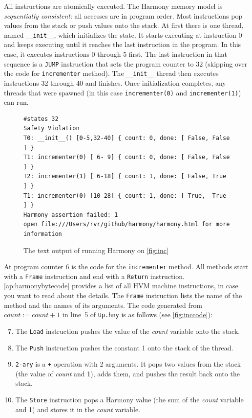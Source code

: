 \documentclass{report}
\newenvironment{code}{
\tcolorbox
}{
\endtcolorbox
}
\begin{document}
%
All instructions are atomically executed.
The Harmony memory model is \emph{sequentially consistent}: all
accesses are in program order.
Most instructions pop values from the stack or push values onto the stack.
At first there is one thread, named \texttt{\_\_init\_\_},
which initializes the state.
It starts executing at instruction 0 and keeps executing until
it reaches the last instruction in the program.
In this case, it executes instructions 0 through 5 first.
The last instruction in that sequence is a \texttt{JUMP}
instruction that sets the program counter to 32
(skipping over the code for \texttt{incrementer} method).
The \texttt{\_\_init\_\_} thread then executes instructions
32 through 40 and finishes.
Once initialization completes, any threads that were spawned
(in this case \texttt{incrementer(0)} and \texttt{incrementer(1)})
can run.

\begin{figure}
\begin{code}
\begin{verbatim}
#states 32
Safety Violation
T0: __init__() [0-5,32-40] { count: 0, done: [ False, False ] }
T1: incrementer(0) [ 6- 9] { count: 0, done: [ False, False ] }
T2: incrementer(1) [ 6-18] { count: 1, done: [ False, True  ] }
T1: incrementer(0) [10-28] { count: 1, done: [ True,  True  ] }
Harmony assertion failed: 1
open file:///Users/rvr/github/harmony/harmony.html for more information
\end{verbatim}
\end{code}
\caption{The text output of running Harmony on \autoref{fig:inc}}
\label{fig:incoutput}
\end{figure}

At program counter 6 is the code for the \texttt{incrementer} method.
All methods start with a \texttt{Frame} instruction and end with a
\texttt{Return} instruction.
\autoref{ap:harmonybytecode} provides a list of all HVM machine instructions,
in case you want to read about the details.
The \texttt{Frame} instruction lists the name of the method and the
names of its arguments.
The code generated from $\mathit{count} := \mathit{count} + 1$ in line~5 of
\texttt{Up.hny} is as follows (see \autoref{fig:inccode}):

\begin{enumerate} \setcounter{enumi}{6}
\item The \texttt{Load} instruction pushes the value of the
\textit{count} variable onto the stack.
\item The \texttt{Push} instruction pushes the constant 1
onto the stack of the thread.
\item \texttt{2-ary} is a \texttt{+} operation with 2 arguments.
It pops two values from the stack (the value of \textit{count} and 1),
adds them, and pushes the result back onto the stack.
\item The \texttt{Store} instruction pops
a Harmony value (the sum of the \textit{count} variable and 1) and
stores it in the \textit{count} variable.
\end{enumerate}
\end{document}
